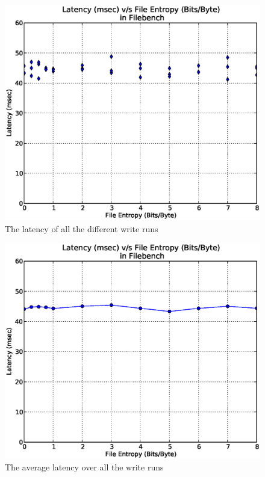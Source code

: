 \begin{figure}[H]
\begin{center}
\includegraphics[scale=.55]{../results/set2/write_latency_2.eps}
\caption{The latency of all the different write runs}
\label{fig:wl}
\end{center}
\end{figure}


\begin{figure}[H]
\begin{center}
\includegraphics[scale=.55]{../results/set2/write_latency_avg_2.eps}
\caption{The average latency over all the write runs}
\label{fig:wlavg}
\end{center}
\end{figure}
